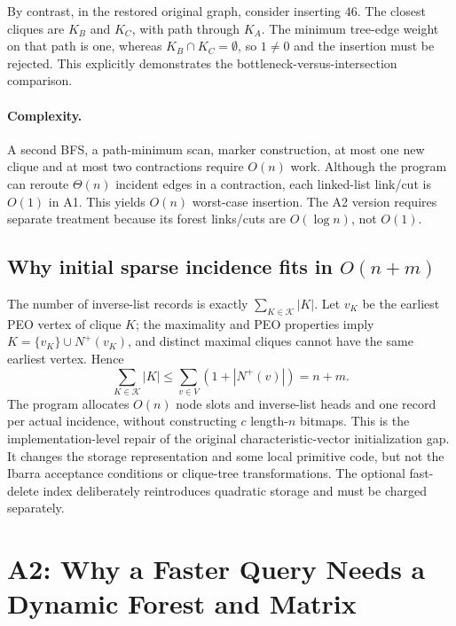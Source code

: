 By contrast, in the restored original graph, consider inserting \(46\).  The closest cliques are \(K_B\) and \(K_C\), with path through \(K_A\).  The minimum tree-edge weight on that path is one, whereas \(K_B\cap K_C=\emptyset\), so \(1\ne0\) and the insertion must be rejected.  This explicitly demonstrates the bottleneck-versus-intersection comparison.

\paragraph{Complexity.} A second BFS, a path-minimum scan, marker construction, at most one new clique and at most two contractions require \(O(n)\) work.  Although the program can reroute \(\Theta(n)\) incident edges in a contraction, each linked-list link/cut is \(O(1)\) in A1.  This yields \(O(n)\) worst-case insertion.  The A2 version requires separate treatment because its forest links/cuts are \(O(\log n)\), not \(O(1)\).

\subsection{Why initial sparse incidence fits in \(O(n+m)\)}
The number of inverse-list records is exactly \(\sum_{K\in\mathcal K}|K|\).  Let \(v_K\) be the earliest PEO vertex of clique \(K\); the maximality and PEO properties imply \(K=\{v_K\}\cup N^+(v_K)\), and distinct maximal cliques cannot have the same earliest vertex.  Hence
\[
\sum_{K\in\mathcal K}|K|
\le\sum_{v\in V}(1+|N^+(v)|)=n+m.
\]
The program allocates \(O(n)\) node slots and inverse-list heads and one record per actual incidence, without constructing \(c\) length-\(n\) bitmaps.  This is the implementation-level repair of the original characteristic-vector initialization gap.  It changes the storage representation and some local primitive code, but not the Ibarra acceptance conditions or clique-tree transformations.  The optional fast-delete index deliberately reintroduces quadratic storage and must be charged separately.

\section{A2: Why a Faster Query Needs a Dynamic Forest and Matrix}
\label{sec:a2-full}
